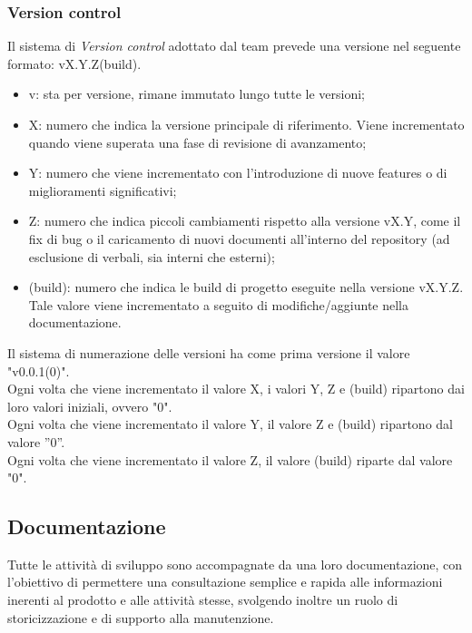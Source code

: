 \documentclass[10pt, a4paper]{article}
\begin{document}
\subsubsection{Version control}
Il sistema di \textit{Version control} adottato dal team prevede una versione nel seguente formato: vX.Y.Z(build).
\begin{itemize}
    \item v: sta per versione, rimane immutato lungo tutte le versioni;
    \item X: numero che indica la versione principale di riferimento. Viene incrementato quando viene superata una fase di revisione di avanzamento;
    \item Y: numero che viene incrementato con l'introduzione di nuove features o di miglioramenti significativi;
    \item Z:  numero che indica piccoli cambiamenti rispetto alla versione vX.Y, come il fix di bug o il caricamento di nuovi documenti all'interno del repository (ad esclusione di verbali, sia interni che esterni);
    \item (build): numero che indica le build di progetto eseguite nella versione vX.Y.Z. Tale valore viene incrementato a seguito di modifiche/aggiunte nella documentazione.
\end{itemize}
Il sistema di numerazione delle versioni ha come prima versione il valore "v0.0.1(0)".\\
Ogni volta che viene incrementato il valore X, i valori Y, Z e (build) ripartono dai loro valori iniziali, ovvero "0".\\
Ogni volta che viene incrementato il valore Y, il valore Z e (build) ripartono dal valore ”0”.\\
Ogni volta che viene incrementato il valore Z, il valore (build) riparte dal valore "0".

\subsection{Documentazione}
Tutte le attività di sviluppo sono accompagnate da una loro documentazione, con l’obiettivo di permettere una consultazione semplice e rapida alle informazioni inerenti al prodotto e alle attività stesse, svolgendo inoltre un ruolo di storicizzazione e di supporto alla manutenzione.
\end{document}

